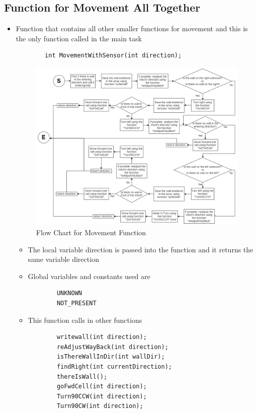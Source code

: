 \documentclass[11pt]{article}
\begin{document}
\subsection{Function for Movement All Together}
\begin{itemize}
\item Function that contains all other smaller functions for movement and this is the only function called in the main task
	\begin{verbatim}
		int MovementWithSensor(int direction);
	\end{verbatim}
\begin{figure}[htp]
\centering
\includegraphics[scale=0.45]{images/Software_Flowchart/MovementWithSensor.png}
\caption{Flow Chart for Movement Function}
\label{}
\end{figure}
	\begin{itemize}
	\item The local variable direction is passed into the function and it returns the same variable direction
	\item Global variables and constants used are
	\begin{verbatim}
		UNKNOWN
		NOT_PRESENT
	\end{verbatim}
	\item This function calls in other functions
	\begin{verbatim}
		writewall(int direction);
		reAdjustWayBack(int direction);
		isThereWallInDir(int wallDir);
		findRight(int currentDirection);
		thereIsWall();
		goFwdCell(int direction);
		Turn90CCW(int direction);
		Turn90CW(int direction);
	\end{verbatim}
	\end{itemize}
\end{itemize}
\newpage
\end{document}
